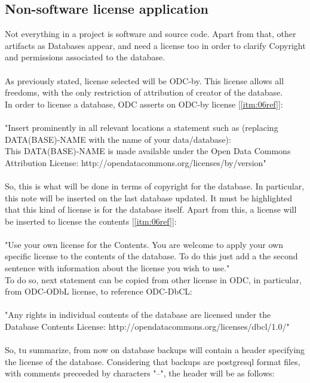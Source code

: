\documentclass[11pt]{article}
\begin{document}
\subsection{Non-software license application}
Not everything in a project is software and source code. Apart from that, other artifacts as Databases appear, and need a license too in order to clarify Copyright and permissions associated to the database.\\
\\
As previously stated, license selected will be ODC-by. This license allows all freedoms, with the only restriction of attribution of creator of the database.\\
In order to license a database, ODC asserts on ODC-by license [\ref{itm:06ref}]:\\
\\
"Insert prominently in all relevant locations a statement such as (replacing {DATA(BASE)-NAME} with the name of your data/database):\\
This {DATA(BASE)-NAME} is made available under the Open Data Commons Attribution License: http://opendatacommons.org/licenses/by/{version}"\\
\\
So, this is what will be done in terms of copyright for the database. In particular, this note will be inserted on the last database updated. It must be highlighted that this kind of license is for the database itself. Apart from this, a license will be inserted to license the contents [\ref{itm:06ref}]:\\
\\
"Use your own license for the Contents. You are welcome to apply your own specific license to the contents of the database. To do this just add a the second sentence with information about the license you wish to use."
\\
To do so, next statement can be copied from other license in ODC, in particular, from ODC-ODbL license, to reference ODC-DbCL:\\
\\
"Any rights in individual contents of the database are licensed under the Database Contents License: http://opendatacommons.org/licenses/dbcl/1.0/"\\
\\
So, tu summarize, from now on database backups will contain a header specifying the license of the database. Considering that backups are postgresql format files, with comments preceeded by characters "--", the header will be as follows:\\
\end{document}
